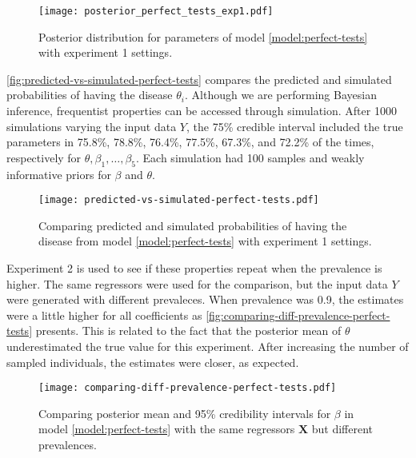 \begin{figure}[!ht]
  \centering
  \caption{\label{fig:result-experiment1-perfect-test}Posterior
    distribution for parameters of model \eqref{model:perfect-tests} with
    experiment 1 settings.}
  \texttt{[image: posterior\_perfect\_tests\_exp1.pdf]}
\end{figure}

\autoref{fig:predicted-vs-simulated-perfect-tests} compares the predicted and
simulated probabilities of having the disease $\theta_i$. Although we are performing Bayesian inference, frequentist properties can be
accessed through simulation. After 1000 simulations varying the input data
$Y$, the 75\% credible interval included the true parameters in 75.8\%, 78.8\%,
76.4\%, 77.5\%, 67.3\%, and 72.2\% of the times, respectively for $\theta,
  \beta_1, \dots, \beta_5$. Each simulation had 100 samples and weakly
informative priors for $\beta$ and $\theta$.

\begin{figure}[!ht]
  \centering
  \caption{\label{fig:predicted-vs-simulated-perfect-tests}Comparing predicted
    and simulated probabilities of having the disease from model
    \eqref{model:perfect-tests} with experiment 1 settings.}
  \texttt{[image: predicted-vs-simulated-perfect-tests.pdf]}
\end{figure}

Experiment 2 is used to see if these properties repeat when the prevalence is
higher. The same regressors were used for the comparison, but the input data
$Y$ were generated with different prevaleces. When prevalence was 0.9, the
estimates were a little higher for all coefficients as
\autoref{fig:comparing-diff-prevalence-perfect-tests} presents. This is
related to the fact that the posterior mean of $\theta$ underestimated the true value for this
experiment. After increasing the number of sampled individuals, the estimates were closer,
as expected.

\begin{figure}[!ht]
  \centering
  \caption{\label{fig:comparing-diff-prevalence-perfect-tests}Comparing
    posterior mean and 95\% credibility intervals for $\beta$ in model \eqref{model:perfect-tests} with the same regressors
    $\boldsymbol{X}$ but different prevalences.}
  \texttt{[image: comparing-diff-prevalence-perfect-tests.pdf]}
\end{figure}

